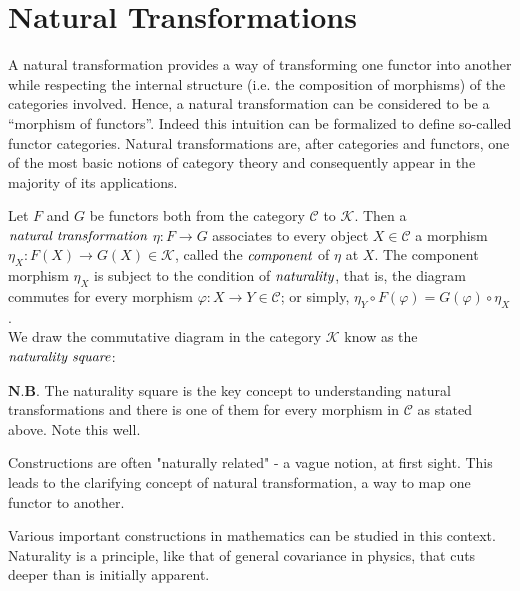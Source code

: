\documentclass[10pt, oneside, reqno]{amsart}
\begin{document}
\section{Natural Transformations} %
\label{sec:natural transformations}
A natural transformation provides a way of transforming one functor into another
while respecting the internal structure (i.e. the composition of morphisms) of the categories involved.
Hence, a natural transformation can be considered to be a ``morphism of functors''.
Indeed this intuition can be formalized to define so-called functor categories.
Natural transformations are, after categories and functors, one of the most basic notions of category theory
and consequently appear in the majority of its applications.

\begin{defn}
 Let $F$ and $G$ be functors both from the category $\mathcal{C}$ to $\mathcal{K}$.
 Then a $\emph{natural transformation}$ $\eta : F \to G$ associates to every object
 $X \in \mathcal{C}$ a morphism $\eta_{X} : F(X) \to G(X) \in \mathcal{K}$, called the $\emph{component}$
 of $\eta$ at $X$. The component morphism $\eta_{X}$ is subject to the condition of $\emph{naturality}$,
 that is, the diagram commutes for every morphism $\varphi: X \to Y \in \mathcal{C}$; or simply,
 $\eta_{Y} \circ F(\varphi) = G(\varphi) \circ \eta_{X}$.
 \\
 We draw the commutative diagram in the category $\mathcal{K}$ know as the $\emph{naturality square}$:
\end{defn}
\begin{rem}
 $\textbf{N.B.}$ The naturality square is the key concept to understanding natural transformations and
 there is one of them for every morphism in $\mathcal{C}$ as stated above. Note this well.
\end{rem}

Constructions are often "naturally related" - a vague notion, at first sight.
This leads to the clarifying concept of natural transformation, a way to map one functor to another.
\begin{rem}
 Various important constructions in mathematics can be studied in this context.
 Naturality is a principle, like that of general covariance in physics, that cuts deeper than is initially apparent.
\end{rem}
\end{document}
